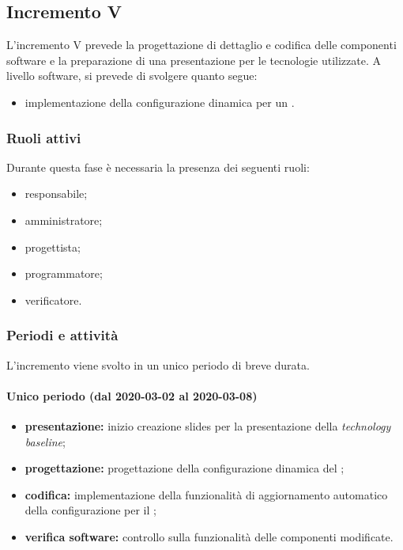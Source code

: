 		\subsection{Incremento V}
			
			L'incremento V prevede la progettazione di dettaglio e codifica delle componenti software e la preparazione di una presentazione per le tecnologie utilizzate. A livello software, si prevede di svolgere quanto segue:
			\begin{itemize}
				\item implementazione della configurazione dinamica per un .
			\end{itemize}
			
			\subsubsection{Ruoli attivi}
			
				Durante questa fase è necessaria la presenza dei seguenti ruoli:
				\begin{itemize}
					\item responsabile;
					\item amministratore;
					\item progettista;
					\item programmatore;
					\item verificatore.
				\end{itemize}
			
			\subsubsection{Periodi e attività}
			
				L'incremento viene svolto in un unico periodo di breve durata.
				
				\paragraph{Unico periodo (dal 2020-03-02 al 2020-03-08)}
				
					\begin{itemize}
						\item \textbf{presentazione:} inizio creazione slides per la presentazione della \textit{technology baseline};
						\item \textbf{progettazione:} progettazione della configurazione dinamica del ;
						\item \textbf{codifica:} implementazione della funzionalità di aggiornamento automatico della configurazione per il ;
						\item \textbf{verifica software:} controllo sulla funzionalità delle componenti modificate.
					\end{itemize} 			

